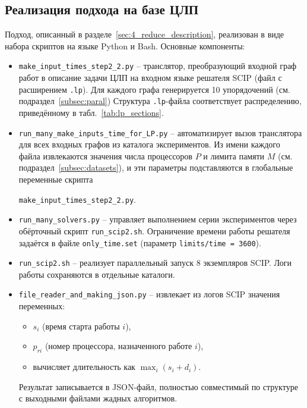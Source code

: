 \subsection{Реализация подхода на базе ЦЛП}\label{sec:real_ILP}

Подход, описанный в разделе~\ref{sec:4_reduce_description}, реализован в виде набора скриптов на языке Python и Bash. Основные компоненты:

\begin{itemize}
	\item \texttt{make\_input\_times\_step2\_2.py} – транслятор, преобразующий входной граф работ в описание задачи ЦЛП на входном языке решателя SCIP (файл с расширением \texttt{.lp}).  
	Для каждого графа генерируется 10 упорядочений (см. подраздел~\ref{subsec:paral})
	Структура \texttt{.lp}-файла соответствует распределению, приведённому в табл.~\ref{tab:lp_sections}.
	
	\item \texttt{run\_many\_make\_inputs\_time\_for\_LP.py} – автоматизирует вызов транслятора для всех входных графов из каталога экспериментов. Из имени каждого файла извлекаются значения числа процессоров $P$ и лимита памяти $M$ (см. подраздел~\ref{subsec:datasets}), и эти параметры подставляются в глобальные переменные скрипта
	
	 \texttt{make\_input\_times\_step2\_2.py}.
	
	\item \texttt{run\_many\_solvers.py} – управляет выполнением серии экспериментов через обёрточный скрипт \texttt{run\_scip2.sh}. Ограничение времени работы решателя задаётся в файле \texttt{only\_time.set} (параметр \texttt{limits/time = 3600}).
	
	\item \texttt{run\_scip2.sh} – реализует параллельный запуск 8 экземпляров SCIP. Логи работы сохраняются в отдельные каталоги.
	
	\item \texttt{file\_reader\_and\_making\_json.py} – извлекает из логов SCIP значения переменных:
	\begin{itemize}
		\item $s_i$ (время старта работы $i$),
		\item $p_{ri}$ (номер процессора, назначенного работе $i$),
		\item вычисляет длительность как $\max_i (s_i + d_i)$.
	\end{itemize}
	Результат записывается в JSON-файл, полностью совместимый по структуре с выходными файлами жадных алгоритмов.\\\\\\
\end{itemize}

